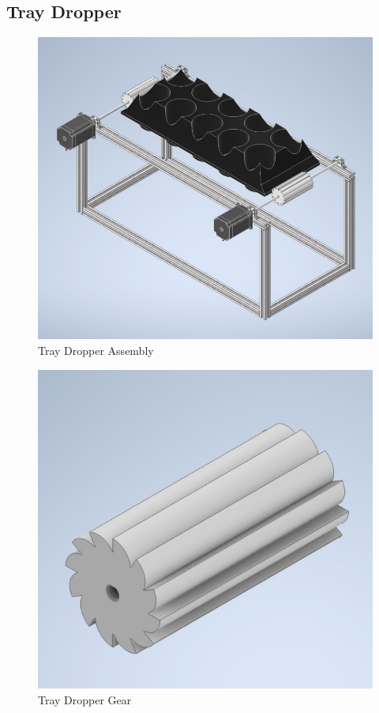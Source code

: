 \documentclass[12pt, titlepage]{article}
\begin{document}
\subsection{Tray Dropper}
\begin{figure}[H]
  \centering
  \includegraphics{Tray_Dropper_Asm.jpg}
  \caption{Tray Dropper Assembly}
  \label{fig:traydropper1}
\end{figure}

\begin{figure}[H]
  \centering
  \includegraphics{Tray_Dropper_Gear.jpg}
  \caption{Tray Dropper Gear}
  \label{fig:traydropper2}
\end{figure}
\end{document}
